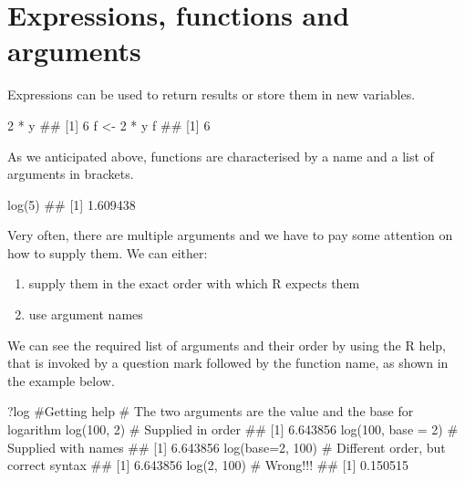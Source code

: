 \documentclass[a4paper,12pt,oneside]{book}
\providecommand{\tightlist}{%
  \setlength{\itemsep}{0pt}\setlength{\parskip}{0pt}}
\newenvironment{Shaded}{\begin{snugshade}}{\end{snugshade}}
\newcommand{\DecValTok}[1]{#1}
\newcommand{\SpecialCharTok}[1]{#1}
\newcommand{\CommentTok}[1]{#1}
\newcommand{\DocumentationTok}[1]{#1}
\newcommand{\OtherTok}[1]{#1}
\newcommand{\FunctionTok}[1]{#1}
\newcommand{\AttributeTok}[1]{#1}
\newcommand{\NormalTok}[1]{#1}
\begin{document}
\hypertarget{expressions-functions-and-arguments}{%
\section{Expressions, functions and arguments}\label{expressions-functions-and-arguments}}

Expressions can be used to return results or store them in new variables.

\begin{Shaded}
\begin{Highlighting}[]
\DecValTok{2} \SpecialCharTok{*}\NormalTok{ y}
\DocumentationTok{\#\# [1] 6}
\NormalTok{f  }\OtherTok{\textless{}{-}}  \DecValTok{2} \SpecialCharTok{*}\NormalTok{ y}
\NormalTok{f}
\DocumentationTok{\#\# [1] 6}
\end{Highlighting}
\end{Shaded}

As we anticipated above, functions are characterised by a name and a list of arguments in brackets.

\begin{Shaded}
\begin{Highlighting}[]
\FunctionTok{log}\NormalTok{(}\DecValTok{5}\NormalTok{)}
\DocumentationTok{\#\# [1] 1.609438}
\end{Highlighting}
\end{Shaded}

Very often, there are multiple arguments and we have to pay some attention on how to supply them. We can either:

\begin{enumerate}
\def\labelenumi{\arabic{enumi}.}
\tightlist
\item
  supply them in the exact order with which R expects them
\item
  use argument names
\end{enumerate}

We can see the required list of arguments and their order by using the R help, that is invoked by a question mark followed by the function name, as shown in the example below.

\begin{Shaded}
\begin{Highlighting}[]
\NormalTok{?log }\CommentTok{\#Getting help}
\CommentTok{\# The two arguments are the value and the base for logarithm}
\FunctionTok{log}\NormalTok{(}\DecValTok{100}\NormalTok{, }\DecValTok{2}\NormalTok{) }\CommentTok{\# Supplied in order}
\DocumentationTok{\#\# [1] 6.643856}
\FunctionTok{log}\NormalTok{(}\DecValTok{100}\NormalTok{, }\AttributeTok{base =} \DecValTok{2}\NormalTok{) }\CommentTok{\# Supplied with names}
\DocumentationTok{\#\# [1] 6.643856}
\FunctionTok{log}\NormalTok{(}\AttributeTok{base=}\DecValTok{2}\NormalTok{, }\DecValTok{100}\NormalTok{) }\CommentTok{\# Different order, but correct syntax}
\DocumentationTok{\#\# [1] 6.643856}
\FunctionTok{log}\NormalTok{(}\DecValTok{2}\NormalTok{, }\DecValTok{100}\NormalTok{) }\CommentTok{\# Wrong!!!}
\DocumentationTok{\#\# [1] 0.150515}
\end{Highlighting}
\end{Shaded}
\end{document}
